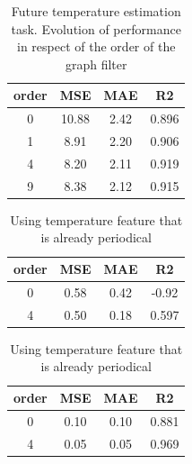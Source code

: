 \documentclass{article} %
\begin{document}
\begin{table}
    \centering
    \begin{tabular}{c|ccc}
        order & MSE & MAE & R2 \\ \hline
        0 & 10.88 & 2.42 & 0.896\\
        1 & 8.91 & 2.20 & 0.906\\
        4 & 8.20 & 2.11 & 0.919\\
        9 & 8.38 & 2.12 & 0.915\\
    \end{tabular}
    \caption{Future temperature estimation task. Evolution of performance in respect of the order of the graph filter}
    \label{tab:future_results}
    \hfill
\end{table}

\begin{table}
    \centering
    \begin{minipage}{0.48\linewidth}
    \begin{tabular}{c|ccc}
        order & MSE & MAE & R2 \\ \hline
        0 & 0.58 & 0.42 & -0.92\\
        4 & 0.50 & 0.18 & 0.597\\
    \end{tabular}
    \caption{Find day in year using precipitation}
    \label{tab:glob_prec}
    \end{minipage}
    \hfill
    \begin{minipage}{0.48\linewidth}
    \begin{tabular}{c|ccc}
        order & MSE & MAE & R2 \\ \hline
        0 & 0.10 & 0.10 & 0.881\\
        4 & 0.05 & 0.05 & 0.969\\
    \end{tabular}
    \caption{Using temperature feature that is already periodical}
    \label{tab:glob_all}
    \end{minipage}
\end{table}
\end{document}

